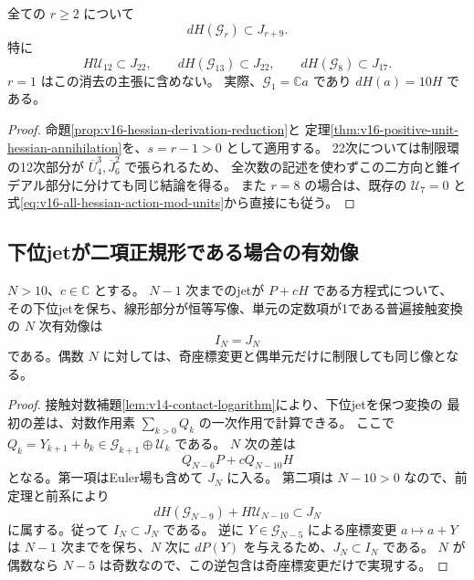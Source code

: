 \begin{corollary}
\label{cor:v16-all-hessian-first-actions}
全ての $r\ge2$ について
\begin{equation}\label{eq:v16-all-hessian-first-actions}
 dH(\mathcal G_r)\subset J_{r+9}.
\end{equation}
特に
\[
 H\mathcal U_{12}\subset J_{22},\qquad
 dH(\mathcal G_{13})\subset J_{22},\qquad
 dH(\mathcal G_8)\subset J_{17}.
\]
$r=1$ はこの消去の主張に含めない。
実際、$\mathcal G_1=\mathbb C a$ であり $dH(a)=10H$ である。
\end{corollary}

\begin{proof}
命題\ref{prop:v16-hessian-derivation-reduction}と
定理\ref{thm:v16-positive-unit-hessian-annihilation}を、$s=r-1>0$ として適用する。
22次については制限環の12次部分が $\overline U_4^3,\overline J_6^2$ で張られるため、
全次数の記述を使わずこの二方向と錐イデアル部分に分けても同じ結論を得る。
また $r=8$ の場合は、既存の $\mathcal U_7=0$ と
式\eqref{eq:v16-all-hessian-action-mod-units}から直接にも従う。
\end{proof}

\subsection{下位jetが二項正規形である場合の有効像}

\begin{theorem}[二項正規形の後の有効像は全次数で通常像に等しい]
\label{thm:v16-all-effective-images}
$N>10$、$c\in\mathbb C$ とする。
$N-1$ 次までのjetが $P+cH$ である方程式について、
その下位jetを保ち、線形部分が恒等写像、単元の定数項が1である普遍接触変換の
$N$ 次有効像は
\begin{equation}\label{eq:v16-all-effective-images}
 I_N=J_N
\end{equation}
である。偶数 $N$ に対しては、奇座標変更と偶単元だけに制限しても同じ像となる。
\end{theorem}

\begin{proof}
接触対数補題\ref{lem:v14-contact-logarithm}により、下位jetを保つ変換の
最初の差は、対数作用素 $\sum_{k>0}Q_k$ の一次作用で計算できる。
ここで $Q_k=Y_{k+1}+b_k\in\mathcal G_{k+1}\oplus\mathcal U_k$ である。
$N$ 次の差は
\[
 Q_{N-6}P+cQ_{N-10}H
\]
となる。第一項はEuler場も含めて $J_N$ に入る。
第二項は $N-10>0$ なので、前定理と前系により
\[
 dH(\mathcal G_{N-9})+H\mathcal U_{N-10}\subset J_N
\]
に属する。従って $I_N\subset J_N$ である。
逆に $Y\in\mathcal G_{N-5}$ による座標変更 $a\mapsto a+Y$ は
$N-1$ 次までを保ち、$N$ 次に $dP(Y)$ を与えるため、$J_N\subset I_N$ である。
$N$ が偶数なら $N-5$ は奇数なので、この逆包含は奇座標変更だけで実現する。
\end{proof}

